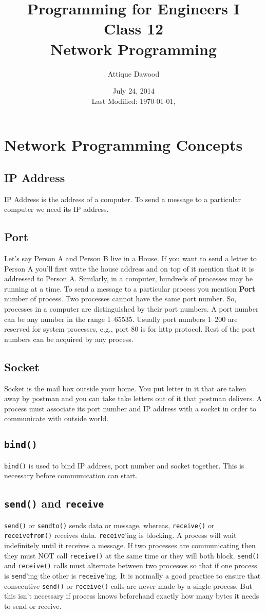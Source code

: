 \documentclass[12pt,a4paper]{article}
\title{Programming for Engineers I\\Class 12\\Network Programming}
\author{Attique Dawood}
\date{July 24, 2014\\[0.2cm] Last Modified: \today, \currenttime}
\begin{document}
\maketitle
\section{Network Programming Concepts}
\subsection{IP Address}
IP Address is the address of a computer. To send a message to a particular computer we need its IP address.
\subsection{Port}
Let's say Person A and Person B live in a House. If you want to send a letter to Person A you'll first write the house address and on top of it mention that it is addressed to Person A. Similarly, in a computer, hundreds of processes may be running at a time. To send a message to a particular process you mention \textbf{Port} number of process. Two processes cannot have the same port number. So, processes in a computer are distinguished by their port numbers. A port number can be any number in the range 1--65535. Usually port numbers 1--200 are reserved for system processes, e.g., port 80 is for http protocol. Rest of the port numbers can be acquired by any process.
\subsection{Socket}
Socket is the mail box outside your home. You put letter in it that are taken away by postman and you can take take letters out of it that postman delivers. A process must associate its port number and IP address with a socket in order to communicate with outside world.
\subsection{\texttt{bind()}}
\verb|bind()| is used to bind IP address, port number and socket together. This is necessary before communication can start.
\subsection{\texttt{send()} and \texttt{receive}}
\verb|send()| or \verb|sendto()| sends data or message, whereas, \verb|receive()| or \verb|receivefrom()| receives data. \verb|receive|'ing is blocking. A process will wait indefinitely until it receives a message. If two processes are communicating then they must NOT call \verb|receive()| at the same time or they will both block. \verb|send()| and \verb|receive()| calls must alternate between two processes so that if one process is \verb|send|'ing the other is \verb|receive|'ing. It is normally a good practice to ensure that consecutive \verb|send()| or \verb|receive()| calls are never made by a single process. But this isn't necessary if process knows beforehand exactly how many bytes it needs to send or receive.
\end{document}
